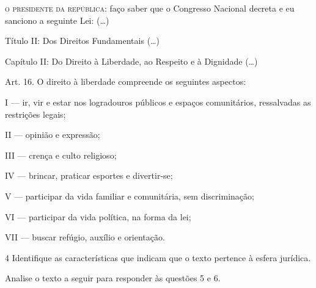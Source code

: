 \begin{myquote}

\textsc{o presidente da república}: faço saber que o Congresso Nacional decreta e
eu sanciono a seguinte Lei: (\ldots{})

Título II: Dos Direitos Fundamentais (\ldots{})

Capítulo II: Do Direito à Liberdade, ao Respeito e à Dignidade (\ldots{})

Art. 16. O direito à liberdade compreende os seguintes aspectos:

I --- ir, vir e estar nos logradouros públicos e espaços comunitários,
ressalvadas as restrições legais;

II --- opinião e expressão;

III --- crença e culto religioso;

IV --- brincar, praticar esportes e divertir-se;

V --- participar da vida familiar e comunitária, sem discriminação;

VI --- participar da vida política, na forma da lei;

VII --- buscar refúgio, auxílio e orientação. \\

\end{myquote}


\num{4} Identifique as características que indicam que o texto pertence à 
esfera jurídica.




Analise o texto a seguir para responder às questões 5 e 6. 


